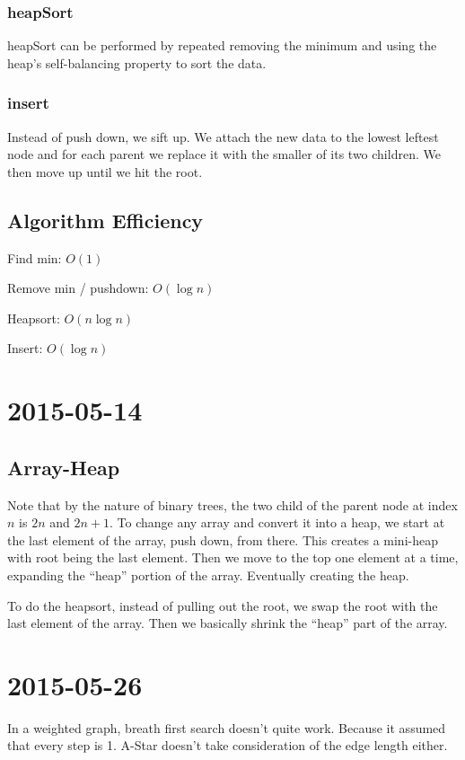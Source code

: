 \documentclass [12 pt, twoside] {article}
\begin{document}
\subsubsection{heapSort}
heapSort can be performed by repeated removing the minimum and using the heap's
self-balancing property to sort the data.

\subsubsection{insert}
Instead of push down, we sift up. We attach the new data to the lowest leftest
node and for each parent we replace it with the smaller of its two children. We
then move up until we hit the root.

\subsection{Algorithm Efficiency}
Find min: $O(1)$

Remove min / pushdown: $O(\log{n})$

Heapsort: $O(n\log{n})$

Insert: $O(\log{n})$

\section{2015-05-14}
\subsection{Array-Heap}
Note that by the nature of binary trees, the two child of the parent node at
index $n$ is $2n$ and $2n+1$. To change any array and convert it into a heap, we
start at the last element of the array, push down, from there. This creates a
mini-heap with root being the last element. Then we move to the top one element
at a time, expanding the ``heap'' portion of the array. Eventually creating the
heap.

To do the heapsort, instead of pulling out the root, we swap the root with the
last element of the array. Then we basically shrink the ``heap'' part of the
array.

\section{2015-05-26}
In a weighted graph, breath first search doesn't quite work. Because it assumed
that every step is 1. A-Star doesn't take consideration of the edge length
either.
\end{document}
